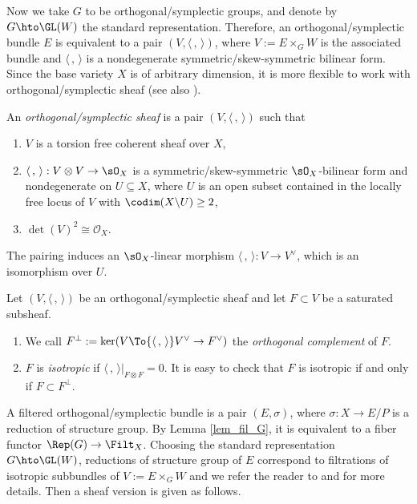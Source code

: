Now we take $G$ to be orthogonal/symplectic groups, and
denote by $G \hto \GL(W)$ the standard representation. Therefore, an orthogonal/symplectic bundle $E$ is equivalent to a pair $(V, \langle \,, \, \rangle)$, where $V:=E \times_G W$ is the associated bundle and $\langle \,, \, \rangle$ is a nondegenerate symmetric/skew-symmetric bilinear form. Since the base variety $X$ is of arbitrary dimension, it is more flexible to work with orthogonal/symplectic sheaf (see also \cite[\S 5]{GS03}).
\begin{defn}
An \emph{orthogonal/symplectic sheaf} is a pair $(V, \langle \,, \, \rangle)$ such that
\begin{enumerate}
\item $V$ is a torsion free coherent sheaf over $X$,

\item $\langle \,, \, \rangle:V\otimes V\to \sO_X$ is a symmetric/skew-symmetric $\sO_X$-bilinear form and nondegenerate on $U \subseteq X$, where $U$ is an open subset contained in the locally free locus of $V$ with $\codim(X \backslash U)\geq 2$,

\item $\det(V)^2 \cong \mathcal{O}_X$.
\end{enumerate}
\end{defn}
The pairing induces an $\sO_X$-linear morphism $\langle \,, \, \rangle: V\to V^{\vee}$, which is an isomorphism over $U$.
\begin{defn}
Let $(V,\langle \,, \, \rangle)$ be an orthogonal/symplectic sheaf and let $F\subset V$ be a saturated subsheaf.
\begin{enumerate}
\item We call $F^{\perp}:=\ker(V\To{\langle \,, \, \rangle} V^{\vee}\to F^{\vee})$ the \emph{orthogonal complement} of $F$.

\item $F$ is \emph{isotropic} if $\langle \,, \, \rangle|_{F\otimes F}=0$. It is easy to check that $F$ is isotropic if and only if $F\subset F^{\perp}$.
\end{enumerate}
\end{defn}

A filtered orthogonal/symplectic bundle is a pair $(E,\sigma)$, where $\sigma: X \to E/P$ is a reduction of structure group. By Lemma \ref{lem_fil_G}, it is equivalent to a fiber functor $\Rep(G) \to \Filt_X$. Choosing the standard representation $G \hto \GL(W)$, reductions of structure group of $E$ correspond to filtrations of isotropic subbundles of $V:=E \times_G W$ and we refer the reader to \cite[\S 6]{CS21} and \cite[\S 5]{Ya22} for more details. Then a sheaf version is given as follows.

